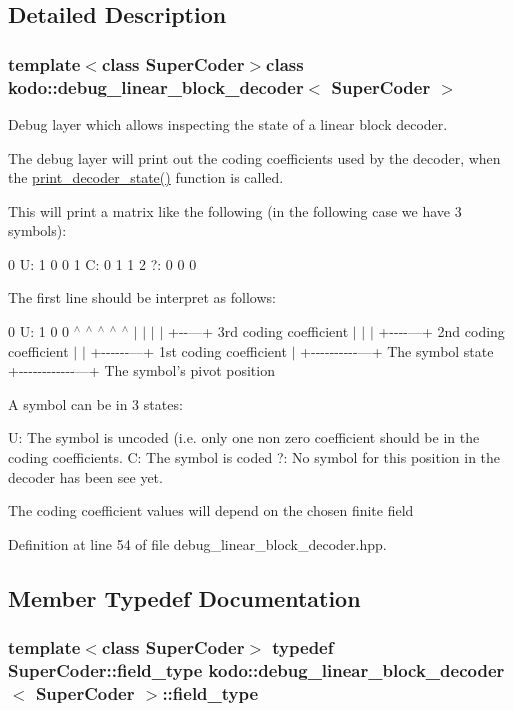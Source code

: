 \subsection{Detailed Description}
\subsubsection*{template$<$class Super\-Coder$>$class kodo\-::debug\-\_\-linear\-\_\-block\-\_\-decoder$<$ Super\-Coder $>$}

Debug layer which allows inspecting the state of a linear block decoder. 

The debug layer will print out the coding coefficients used by the decoder, when the \hyperlink{classkodo_1_1debug__linear__block__decoder_a54c858fcc072f9e199fa8bc5eb08f467}{print\-\_\-decoder\-\_\-state()} function is called.

This will print a matrix like the following (in the following case we have 3 symbols)\-:

0 U\-: 1 0 0 1 C\-: 0 1 1 2 ?\-: 0 0 0

The first line should be interpret as follows\-:

0 U\-: 1 0 0 $^\wedge$ $^\wedge$ $^\wedge$ $^\wedge$ $^\wedge$ $|$ $|$ $|$ $|$ +-\/-\/---+ 3rd coding coefficient $|$ $|$ $|$ +-\/-\/-\/-\/---+ 2nd coding coefficient $|$ $|$ +-\/-\/-\/-\/-\/-\/---+ 1st coding coefficient $|$ +-\/-\/-\/-\/-\/-\/-\/-\/-\/-\/---+ The symbol state +-\/-\/-\/-\/-\/-\/-\/-\/-\/-\/-\/-\/---+ The symbol's pivot position

A symbol can be in 3 states\-:

U\-: The symbol is uncoded (i.\-e. only one non zero coefficient should be in the coding coefficients. C\-: The symbol is coded ?\-: No symbol for this position in the decoder has been see yet.

The coding coefficient values will depend on the chosen finite field 

Definition at line 54 of file debug\-\_\-linear\-\_\-block\-\_\-decoder.\-hpp.



\subsection{Member Typedef Documentation}
\hypertarget{classkodo_1_1debug__linear__block__decoder_ac2c8432c147cc801713c1feeabb012b9}{
\subsubsection[{field\-\_\-type}]{\setlength{\rightskip}{0pt plus 5cm}template$<$class Super\-Coder$>$ typedef Super\-Coder\-::field\-\_\-type {\bf kodo\-::debug\-\_\-linear\-\_\-block\-\_\-decoder}$<$ Super\-Coder $>$\-::{\bf field\-\_\-type}}}\label{classkodo_1_1debug__linear__block__decoder_ac2c8432c147cc801713c1feeabb012b9}




